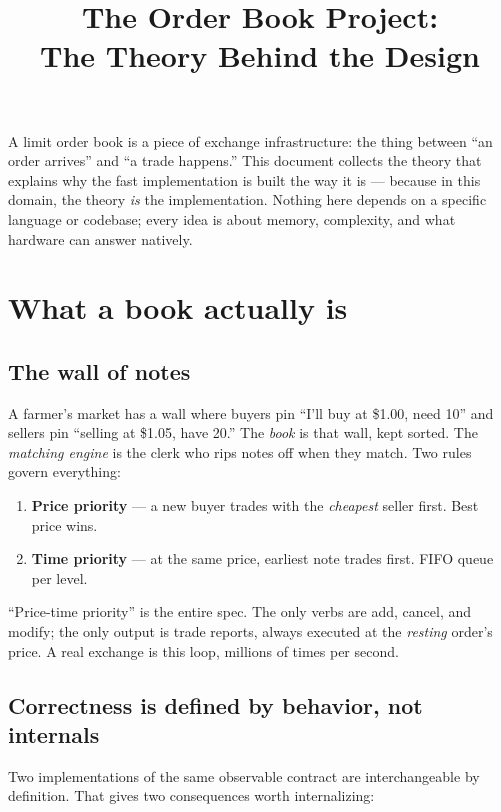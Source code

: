 \documentclass[11pt]{article}
\title{\bfseries The Order Book Project:\\[4pt]
       \large The Theory Behind the Design}
\author{}
\date{}
\begin{document}
\maketitle
\thispagestyle{fancy}

\noindent A limit order book is a piece of exchange infrastructure: the thing
between ``an order arrives'' and ``a trade happens.'' This document collects
the theory that explains why the fast implementation is built the way it is
--- because in this domain, the theory \emph{is} the implementation. Nothing
here depends on a specific language or codebase; every idea is about memory,
complexity, and what hardware can answer natively.

\section{What a book actually is}

\subsection{The wall of notes}

A farmer's market has a wall where buyers pin ``I'll buy at \$1.00, need 10''
and sellers pin ``selling at \$1.05, have 20.'' The \emph{book} is that wall,
kept sorted. The \emph{matching engine} is the clerk who rips notes off when
they match. Two rules govern everything:

\begin{enumerate}
  \item \textbf{Price priority} --- a new buyer trades with the
        \emph{cheapest} seller first. Best price wins.
  \item \textbf{Time priority} --- at the same price, earliest note trades
        first. FIFO queue per level.
\end{enumerate}

``Price-time priority'' is the entire spec. The only verbs are
add, cancel, and modify; the only output is trade reports, always executed
at the \emph{resting} order's price. A real exchange is this loop, millions
of times per second.

\subsection{Correctness is defined by behavior, not internals}

Two implementations of the same observable contract are interchangeable by
definition. That gives two consequences worth internalizing:
\end{document}
